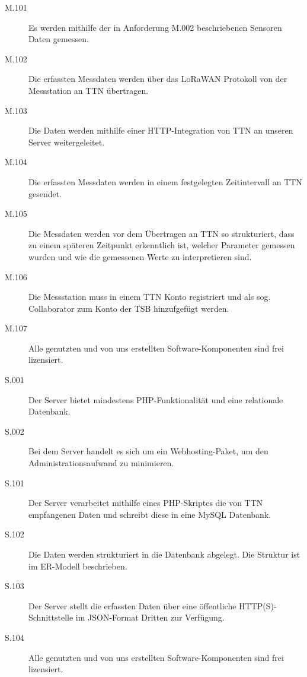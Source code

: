 \documentclass[
11pt,
a4paper,
ngerman,
]{article}
\begin{document}
\begin{description}
	\item[M.101]
		Es werden mithilfe der in Anforderung M.002 beschriebenen Sensoren Daten gemessen.

	\item[M.102]
		Die erfassten Messdaten werden über das LoRaWAN Protokoll von der Messstation
		an TTN übertragen.

	\item[M.103]
		Die Daten werden mithilfe einer HTTP-Integration von TTN an unseren Server
		weitergeleitet.

	\item[M.104]
		Die erfassten Messdaten werden in einem festgelegten Zeitintervall an TTN
		gesendet.

	\item[M.105]
		Die Messdaten werden vor dem Übertragen an TTN so strukturiert, dass zu einem
		späteren Zeitpunkt erkenntlich ist, welcher Parameter gemessen wurden und wie
		die gemessenen Werte zu interpretieren sind.

	\item[M.106]
		Die Messstation muss in einem TTN Konto registriert und als sog.
		\glqq Collaborator\grqq{} zum Konto der TSB hinzufgefügt werden.

	\item[M.107]
		Alle genutzten und von uns erstellten Software-Komponenten sind frei lizensiert.
\end{description}

\begin{description}
	\item[S.001]
		Der Server bietet mindestens PHP-Funktionalität und eine relationale Datenbank.

	\item[S.002]
		Bei dem Server handelt es sich um ein Webhosting-Paket, um den
		Administrationsaufwand zu minimieren.
\end{description}

\begin{description}
	\item[S.101]
		Der Server verarbeitet mithilfe eines PHP-Skriptes die von TTN empfangenen
		Daten und schreibt diese in eine MySQL Datenbank.

	\item[S.102]
		Die Daten werden strukturiert in die Datenbank abgelegt. Die Struktur ist im
		ER-Modell beschrieben.

	\item[S.103]
		Der Server stellt die erfassten Daten über eine öffentliche HTTP(S)-Schnittstelle
		im JSON-Format Dritten zur Verfügung.

	\item[S.104]
		Alle genutzten und von uns erstellten Software-Komponenten sind frei lizensiert.
\end{description}
\end{document}
